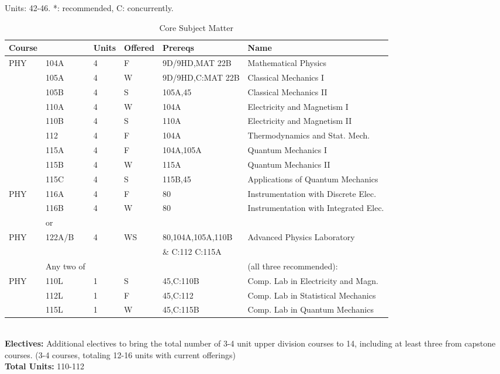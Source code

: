 \documentclass[12pt]{article}
\begin{document}
\begin{table}
\caption{\label{tbl:core}Core Subject Matter}
\noindent
\vskip 0.25cm
Units:  42-46. *: recommended, C: concurrently.\\
\begin{tabular}{|llllll|}
\hline
Course & & Units & Offered & Prereqs & Name \\
\hline
PHY & 104A & 4 & F & 9D/9HD,MAT 22B & Mathematical Physics \\ 
    & 105A & 4 & W & 9D/9HD,C:MAT 22B   & Classical Mechanics I\\
    & 105B & 4 & S & 105A,45      & Classical Mechanics II\\ 
    & 110A & 4 & W & 104A         & Electricity and Magnetism I\\
    & 110B & 4 & S & 110A         & Electricity and Magnetism II\\
    & 112  & 4 & F & 104A         & Thermodynamics and Stat. Mech.\\    
    & 115A & 4 & F & 104A,105A    & Quantum Mechanics I \\
    & 115B & 4 & W & 115A         & Quantum Mechanics II \\
    & 115C & 4 & S & 115B,45      & Applications of Quantum Mechanics\\ 
\hline
\hline
PHY & 116A & 4 &  F & 80   & Instrumentation with Discrete Elec.  \\
    & 116B & 4 &  W & 80   & Instrumentation with Integrated Elec.\\ 
\hline
    & or & & & & \\
\hline
PHY & 122A/B & 4 & WS & 80,104A,105A,110B & Advanced Physics Laboratory \\  
    &  & & & \& C:112 C:115A&  \\  

\hline
\hline
 & Any two of & & & & (all three recommended): \\
\hline 
PHY & 110L & 1 & S & 45,C:110B & Comp. Lab in Electricity and Magn. \\
    & 112L & 1 & F & 45,C:112  & Comp. Lab in Statistical Mechanics \\ 
    & 115L & 1 & W & 45,C:115B & Comp. Lab in Quantum Mechanics \\ 
\hline
\end{tabular}\\ \vskip 0.25cm
\noindent
{\bf Electives:} Additional electives to bring the total number of 3-4 unit upper division courses to 14, including at least three from capstone courses.  
(3-4 courses, totaling 12-16 units with current offerings)
\\
\noindent
{\bf Total Units:} 110-112
\end{table}
\end{document}

